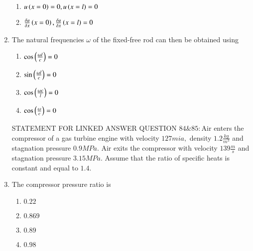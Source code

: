 \documentclass[journal]{IEEEtran}
\begin{document}
\begin{enumerate}
\begin{enumerate}
        \item $u\left(x=0\right)=0,u\left(x=l\right)=0$
      \item $\frac{\delta u}{\delta x}\left(x=0\right),\frac{\delta u}{\delta x}\left(x=l\right)=0$
    \end{enumerate}
    \item The natural frequencies $\omega$ of the fixed-free rod can then be obtained using
    \begin{enumerate}
        \item $\cos\left(\frac{\omega l}{c}\right)=0$
        \item $\sin\left(\frac{\omega l}{c}\right)=0$
        \item $\cos\left(\frac{\omega c}{l}\right)=0$
        \item $\cos\left(\frac{\omega }{c}\right)=0$
    \end{enumerate}
    STATEMENT FOR LINKED ANSWER QUESTION $84\&85:$Air enters the compressor of a gas turbine engine with velocity $127 mia,$ density $1.2 \frac{kg}{m^3}$ and stagnation pressure $0.9 MPa.$ Air exits the compressor with velocity $139 \frac{m}{s}$ and stagnation pressure $3.15 MPa.$ Assume that the ratio of specific heats is constant and equal to $1.4.$
    \item The compressor pressure ratio is
    \begin{enumerate}
        \item $0.22$
        \item $0.869$
        \item $0.89$
        \item $0.98$
    \end{enumerate}
    
\end{enumerate}
\end{document}
